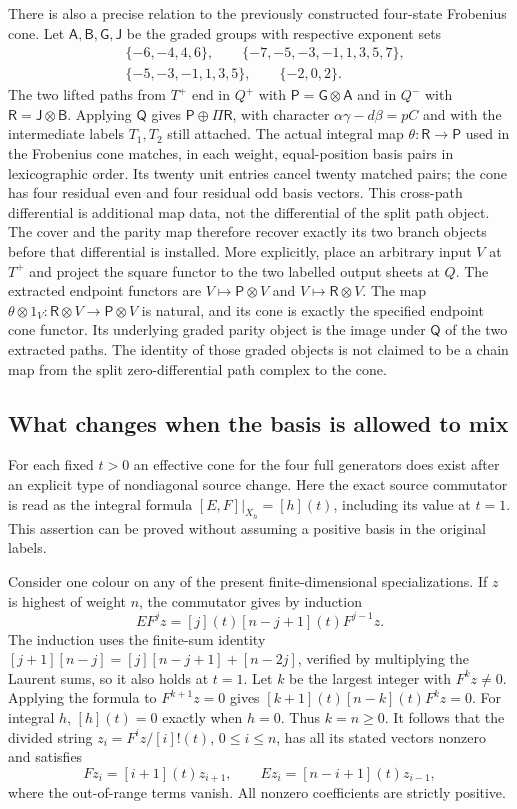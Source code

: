 There is also a precise relation to the previously constructed
four-state Frobenius cone. Let $\mathsf A,\mathsf B,\mathsf G,\mathsf J$
be the graded groups with respective exponent sets
\[
\begin{split}
 &\{-6,-4,4,6\},\qquad\{-7,-5,-3,-1,1,3,5,7\},\\
 &\{-5,-3,-1,1,3,5\},\qquad\{-2,0,2\}.
\end{split}
\]
The two lifted paths from $T^+$ end in $Q^+$ with
$\mathsf P=\mathsf G\otimes\mathsf A$ and in $Q^-$ with
$\mathsf R=\mathsf J\otimes\mathsf B$.
Applying $\mathsf Q$ gives $\mathsf P\oplus\Pi\mathsf R$,
with character $\alpha\gamma-d\beta=pC$ and with the intermediate
labels $T_1,T_2$ still attached. The actual integral map
$\theta:\mathsf R\to\mathsf P$ used in the Frobenius cone matches,
in each weight, equal-position basis pairs in lexicographic order.
Its twenty unit entries cancel twenty matched pairs; the cone has
four residual even and four residual odd basis vectors. This
cross-path differential is additional map data, not the differential
of the split path object. The cover and the parity map therefore
recover exactly its two branch objects before that differential is
installed. More explicitly, place an arbitrary input $V$ at $T^+$
and project the square functor to the two labelled output sheets
at $Q$. The extracted endpoint functors are
$V\mapsto\mathsf P\otimes V$ and
$V\mapsto\mathsf R\otimes V$. The map
$\theta\otimes1_V:\mathsf R\otimes V\to\mathsf P\otimes V$
is natural, and its cone is exactly the specified endpoint cone
functor. Its underlying graded parity object is the image under
$\mathsf Q$ of the two extracted paths. The identity of those
graded objects is not claimed to be a chain map from the split
zero-differential path complex to the cone.

\subsection{What changes when the basis is allowed to mix}

For each fixed $t>0$ an effective cone for the four full generators
does exist after an explicit type of nondiagonal source change.
Here the exact source commutator is read as the integral formula
$[E,F]|_{X_h}=[h](t)$, including its value at $t=1$.
This assertion can be proved without assuming a positive basis in
the original labels.

Consider one colour on any of the present finite-dimensional
specializations. If $z$ is highest of weight $n$, the commutator
gives by induction
\[
 E F^jz=[j](t)[n-j+1](t)F^{j-1}z.
\]
The induction uses the finite-sum identity
$[j+1][n-j]=[j][n-j+1]+[n-2j]$, verified by multiplying the
Laurent sums, so it also holds at $t=1$.
Let $k$ be the largest integer with $F^kz\ne0$. Applying the
formula to $F^{k+1}z=0$ gives
$[k+1](t)[n-k](t)F^kz=0$. For integral $h$, $[h](t)=0$ exactly
when $h=0$. Thus $k=n\geq0$. It follows that the divided string
$z_i=F^iz/[i]!(t)$, $0\leq i\leq n$, has all its stated vectors
nonzero and satisfies
\[
 Fz_i=[i+1](t)z_{i+1},\qquad
 Ez_i=[n-i+1](t)z_{i-1},
\]
where the out-of-range terms vanish. All nonzero coefficients are
strictly positive.

